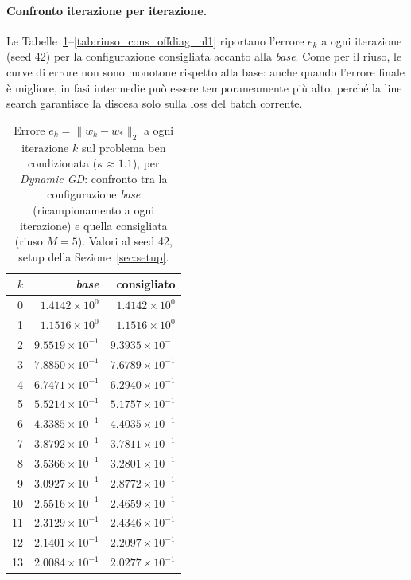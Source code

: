 \paragraph{Confronto iterazione per iterazione.}
Le Tabelle~\ref{tab:riuso_cons_bencond_gd}--\ref{tab:riuso_cons_offdiag_nl1}
riportano l'errore $e_k$ a ogni iterazione (seed 42) per la configurazione
consigliata accanto alla \emph{base}. Come per il riuso, le curve di errore non
sono monotone rispetto alla base: anche quando l'errore finale è migliore, in
fasi intermedie può essere temporaneamente più alto, perché la line search
garantisce la discesa solo sulla loss del batch corrente.

\begin{table}[H]
\centering
\footnotesize
\renewcommand{\arraystretch}{0.85}
\setlength{\tabcolsep}{8pt}
\caption{Errore $e_k=\|w_k-w_*\|_2$ a ogni iterazione $k$ sul problema ben condizionata ($\kappa\approx 1.1$), per \emph{Dynamic GD}: confronto tra la configurazione \emph{base} (ricampionamento a ogni iterazione) e quella consigliata (riuso $M{=}5$). Valori al seed 42, setup della Sezione~\ref{sec:setup}.}
\label{tab:riuso_cons_bencond_gd}
\begin{tabular}{@{}rrr@{}}
\toprule
$k$ & \emph{base} & consigliato\\
\midrule
0 & $1.4142\times10^{0}$ & $1.4142\times10^{0}$\\
1 & $1.1516\times10^{0}$ & $1.1516\times10^{0}$\\
2 & $9.5519\times10^{-1}$ & $9.3935\times10^{-1}$\\
3 & $7.8850\times10^{-1}$ & $7.6789\times10^{-1}$\\
4 & $6.7471\times10^{-1}$ & $6.2940\times10^{-1}$\\
5 & $5.5214\times10^{-1}$ & $5.1757\times10^{-1}$\\
6 & $4.3385\times10^{-1}$ & $4.4035\times10^{-1}$\\
7 & $3.8792\times10^{-1}$ & $3.7811\times10^{-1}$\\
8 & $3.5366\times10^{-1}$ & $3.2801\times10^{-1}$\\
9 & $3.0927\times10^{-1}$ & $2.8772\times10^{-1}$\\
10 & $2.5516\times10^{-1}$ & $2.4659\times10^{-1}$\\
11 & $2.3129\times10^{-1}$ & $2.4346\times10^{-1}$\\
12 & $2.1401\times10^{-1}$ & $2.2097\times10^{-1}$\\
13 & $2.0084\times10^{-1}$ & $2.0277\times10^{-1}$\\

\end{tabular}
\end{table}
